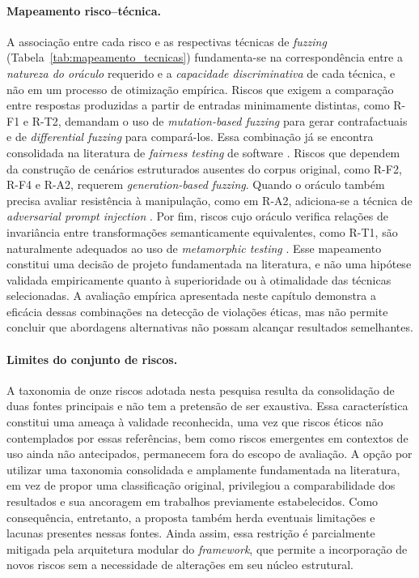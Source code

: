 \paragraph{Mapeamento risco--técnica.} A associação entre cada risco e as respectivas técnicas de \textit{fuzzing} (Tabela~\ref{tab:mapeamento_tecnicas}) fundamenta-se na correspondência entre a \textit{natureza do oráculo} requerido e a \textit{capacidade discriminativa} de cada técnica, e não em um processo de otimização empírica. Riscos que exigem a comparação entre respostas produzidas a partir de entradas minimamente distintas, como R-F1 e R-T2, demandam o uso de \textit{mutation-based fuzzing} para gerar contrafactuais e de \textit{differential fuzzing} para compará-los. Essa combinação já se encontra consolidada na literatura de \textit{fairness testing} de software \cite{Galhotra2017, Udeshi2018}. Riscos que dependem da construção de cenários estruturados ausentes do corpus original, como R-F2, R-F4 e R-A2, requerem \textit{generation-based fuzzing}. Quando o oráculo também precisa avaliar resistência à manipulação, como em R-A2, adiciona-se a técnica de \textit{adversarial prompt injection} \cite{Greshake2023}. Por fim, riscos cujo oráculo verifica relações de invariância entre transformações semanticamente equivalentes, como R-T1, são naturalmente adequados ao uso de \textit{metamorphic testing} \cite{Chen2018}. Esse mapeamento constitui uma decisão de projeto fundamentada na literatura, e não uma hipótese validada empiricamente quanto à superioridade ou à otimalidade das técnicas selecionadas. A avaliação empírica apresentada neste capítulo demonstra a eficácia dessas combinações na detecção de violações éticas, mas não permite concluir que abordagens alternativas não possam alcançar resultados semelhantes.

\paragraph{Limites do conjunto de riscos.} A taxonomia de onze riscos adotada nesta pesquisa resulta da consolidação de duas fontes principais \cite{Huang2023, Makridis2024} e não tem a pretensão de ser exaustiva. Essa característica constitui uma ameaça à validade reconhecida, uma vez que riscos éticos não contemplados por essas referências, bem como riscos emergentes em contextos de uso ainda não antecipados, permanecem fora do escopo de avaliação. A opção por utilizar uma taxonomia consolidada e amplamente fundamentada na literatura, em vez de propor uma classificação original, privilegiou a comparabilidade dos resultados e sua ancoragem em trabalhos previamente estabelecidos. Como consequência, entretanto, a proposta também herda eventuais limitações e lacunas presentes nessas fontes. Ainda assim, essa restrição é parcialmente mitigada pela arquitetura modular do \textit{framework}, que permite a incorporação de novos riscos sem a necessidade de alterações em seu núcleo estrutural.

